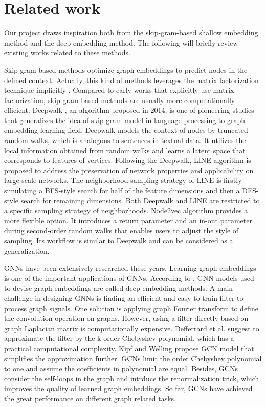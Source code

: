 \documentclass[sigconf]{acmart}
\begin{document}
\section{Related work}
Our project draws inspiration both from the skip-gram-based shallow embedding method and the deep embedding method. The following will briefly review existing works related to these methods.\par
Skip-gram-based methods optimize graph embeddings to predict nodes in the defined context. Actually, this kind of methods leverages the matrix factorization technique implicitly \cite{murphy2022}. Compared to early works that explicitly use matrix factorization, skip-gram-based methods are usually more computationally efficient. Deepwalk \cite{deepwalk}, an algorithm proposed in 2014, is one of pioneering studies that generalizes the idea of skip-gram model in language processing to graph embedding learning field. Deepwalk models the context of nodes by truncated random walks, which is analogous to sentences in textual data. It utilizes the local information obtained from random walks and learns a latent space that corresponds to features of vertices. Following the Deepwalk, LINE algorithm \cite{line} is proposed to address the preservation of network properties and applicability on large-scale networks. The neighborhood sampling strategy of LINE is firstly simulating a BFS-style search for half of the feature dimensions and then a DFS-style search for remaining dimensions. Both Deepwalk and LINE are restricted to a specific sampling strategy of neighborhoods. Node2vec \cite{node2vec} algorithm provides a more flexible option. It introduces a return parameter and an in-out parameter during second-order random walks that enables users to adjust the style of sampling. Its workflow is similar to Deepwalk and can be considered as a generalization.\par
GNNs have been extensively researched these years. Learning graph embeddings is one of the important applications of GNNs. According to \cite{murphy2022}, GNN models used to devise graph embeddings are called deep embedding methods. A main challenge in designing GNNs is finding an efficient and easy-to-train filter to process graph signals. One solution is applying graph Fourier transform to define the convolution operation on graphs. However, using a filter directly based on graph Laplacian matrix is computationally expensive. Defferrard et al. \cite{Defferrard2016} suggest to approximate the filter by the k-order Chebyshev polynomial, which has a practical computational complexity. Kipf and Welling \cite{gcn} propose GCN model that simplifies the approximation further. GCNs limit the order Chebyshev polynomial to one and assume the coefficients in polynomial are equal. Besides, GCNs consider the self-loops in the graph and intrduce the renormalization trick, which improves the quality of learned graph embeddings. So far, GCNs have achieved the great performance on different graph related tasks.\par
\end{document}
